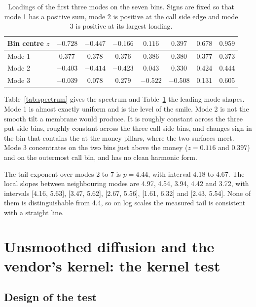 \documentclass[11pt]{article}
\begin{document}
\begin{table}[t]
\centering
\caption{Loadings of the first three modes on the seven bins. Signs are fixed so that mode 1 has a positive sum, mode 2 is positive at the call side edge and mode 3 is positive at its largest loading.}
\label{tab:loadings}
\begin{tabular}{lccccccc}
\toprule
Bin centre $z$ & $-0.728$ & $-0.447$ & $-0.166$ & $0.116$ & $0.397$ & $0.678$ & $0.959$ \\
\midrule
Mode 1 & 0.377 & 0.378 & 0.376 & 0.386 & 0.380 & 0.377 & 0.373 \\
Mode 2 & $-0.403$ & $-0.414$ & $-0.423$ & 0.043 & 0.330 & 0.424 & 0.444 \\
Mode 3 & $-0.039$ & 0.078 & 0.279 & $-0.522$ & $-0.508$ & 0.131 & 0.605 \\
\bottomrule
\end{tabular}
\end{table}

Table~\ref{tab:spectrum} gives the spectrum and Table~\ref{tab:loadings} the leading mode shapes. Mode 1 is almost exactly uniform and is the level of the smile. Mode 2 is not the smooth tilt a membrane would produce. It is roughly constant across the three put side bins, roughly constant across the three call side bins, and changes sign in the bin that contains the at the money pillars, where the two surfaces meet. Mode 3 concentrates on the two bins just above the money ($z=0.116$ and $0.397$) and on the outermost call bin, and has no clean harmonic form.

The tail exponent over modes 2 to 7 is $p=4.44$, with interval 4.18 to 4.67. The local slopes between neighbouring modes are 4.97, 4.54, 3.94, 4.42 and 3.72, with intervals [4.16, 5.63], [3.47, 5.62], [2.67, 5.56], [1.61, 6.32] and [2.43, 5.54]. None of them is distinguishable from 4.4, so on log scales the measured tail is consistent with a straight line.

\section{Unsmoothed diffusion and the vendor's kernel: the kernel test}
\label{sec:kernel}

\subsection{Design of the test}
\end{document}
